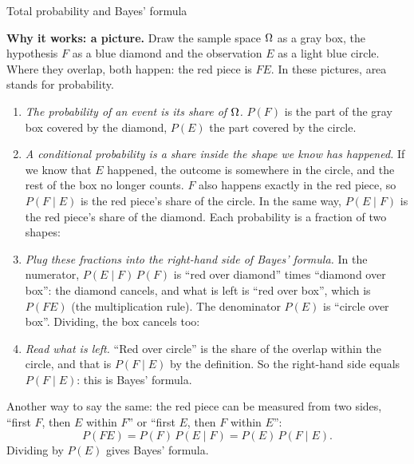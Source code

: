 \begin{key}{Total probability and Bayes' formula}
	\noindent\begin{minipage}{\linewidth}
		\textbf{Why it works: a picture.} Draw the sample space $\Omega$ as a gray
		box, the hypothesis $F$ as a blue diamond and the observation $E$ as a
		light blue circle. Where they overlap, both happen: the red piece is
		$FE$. In these pictures, area stands for probability.
		\begin{center}
			\bayesvenn
		\end{center}
	\end{minipage}
	\begin{enumerate}[nosep,label=\arabic*.]
		\item \emph{The probability of an event is its share of $\Omega$.} $P(F)$
		      is the part of the gray box covered by the diamond, $P(E)$ the
		      part covered by the circle.
		\item \emph{A conditional probability is a share inside the shape we
			      know has happened.} If we know that $E$ happened, the outcome
		      is somewhere in the circle, and the rest of the box no longer
		      counts. $F$ also happens exactly in the red piece, so $P(F\mid E)$
		      is the red piece's share of the circle. In the same way,
		      $P(E\mid F)$ is the red piece's share of the diamond. Each
		      probability is a fraction of two shapes:
		      \begin{center}
			      \bayesshares
		      \end{center}
		\item \emph{Plug these fractions into the right-hand side of Bayes'
			      formula.} In the numerator, ${P(E\mid F)\,P(F)}$ is ``red over
		      diamond'' times ``diamond over box'': the diamond cancels, and
		      what is left is ``red over box'', which is $P(FE)$ (the
		      multiplication rule). The denominator $P(E)$ is ``circle over
		      box''. Dividing, the box cancels too:
		      \begin{center}
			      \bayesproof
		      \end{center}
		\item \emph{Read what is left.} ``Red over circle'' is the share of the
		      overlap within the circle, and that is $P(F\mid E)$ by the
		      definition. So the right-hand side equals $P(F\mid E)$: this is
		      Bayes' formula.
	\end{enumerate}
	Another way to say the same: the red piece can be measured from two
	sides, ``first $F$, then $E$ within $F$'' or ``first $E$, then $F$ within
	$E$'':
	\[ P(FE)=P(F)\,P(E\mid F)=P(E)\,P(F\mid E). \]
	Dividing by $P(E)$ gives Bayes' formula.


\end{key}
